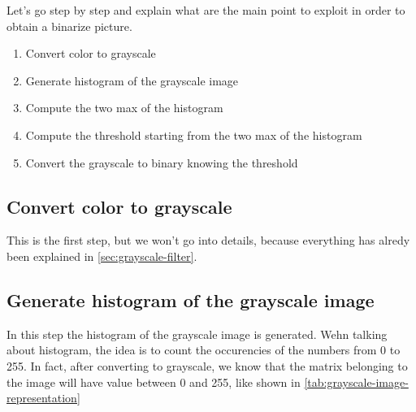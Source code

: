 \documentclass[paper=a4, fontsize=10pt]{scrartcl}	%
\begin{document}
	Let's go step by step and explain what are the main point to exploit in order to obtain a binarize picture. 

	\begin{enumerate}
		\item Convert color to grayscale
		\item Generate histogram of the grayscale image
		\item Compute the two max of the histogram
		\item Compute the threshold starting from the two max of the histogram
		\item Convert the grayscale to binary knowing the threshold
	\end{enumerate}

	\subsection{Convert color to grayscale}

	This is the first step, but we won't go into details, because everything has alredy been explained in \autoref{sec:grayscale-filter}.

	\subsection{Generate histogram of the grayscale image}

	In this step the histogram of the grayscale image is generated. Wehn talking about histogram, the idea is to count the occurencies of the numbers from 0 to 255. In fact, after converting to grayscale, we know that the matrix belonging to the image will have value between 0 and 255, like shown in \autoref{tab:grayscale-image-representation}
\end{document}
